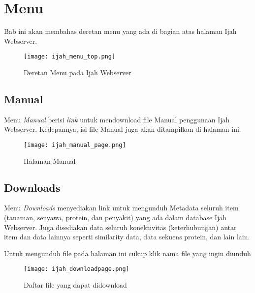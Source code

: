 \chapter{Menu} \label{Menu}

Bab ini akan membahas deretan menu yang ada di bagian atas halaman Ijah Webserver.

\begin{figure}[H]
	\centering
	\texttt{[image: ijah\_menu\_top.png]}
	\caption{Deretan Menu pada Ijah Webserver}
	\label{fig:ijah_menu_top}
\end{figure}

\section{Manual}

Menu \emph{Manual} berisi \emph{link} untuk mendownload file Manual penggunaan Ijah Webserver. Kedepannya, isi file Manual juga akan ditampilkan di halaman ini.

\begin{figure}[H]
	\centering
	\texttt{[image: ijah\_manual\_page.png]}
	\caption{Halaman Manual}
	\label{fig:ijah_manual_page}
\end{figure}

\section{Downloads} \label{Downloads}

Menu \emph{Downloads} menyediakan link untuk mengunduh Metadata seluruh item (tanaman, senyawa, protein, dan penyakit) yang ada dalam database Ijah Webserver. Juga disediakan data seluruh konektivitas (keterhubungan) antar item dan data lainnya seperti similarity data, data sekuens protein, dan lain lain.

Untuk mengunduh file pada halaman ini cukup klik nama file yang ingin diunduh

\begin{figure}[H]
	\centering
	\texttt{[image: ijah\_downloadpage.png]}
	\caption{Daftar file yang dapat di\-download}
	\label{fig:ijah_downloadpage}
\end{figure}

